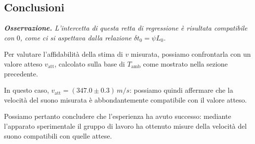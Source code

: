 \documentclass{article}
\begin{document}
\subsection{Conclusioni}
\emph{
  \textbf{Osservazione.}
  L'intercetta di questa retta di regressione è
  risultata compatibile con $0$, come ci si aspettava
  dalla relazione $\delta t_0 = \psi L_0$.
}

\vspace{2mm}
Per valutare l'affidabilità della stima di $v$ misurata,
possiamo confrontarla con un valore atteso $v_\text{att}$,
calcolato sulla base di $T_\text{amb}$ come mostrato nella
sezione precedente.

In questo caso, $v_\text{att} = (347.0\pm0.3)\,\unit{m \per s}$:
possiamo quindi affermare che la velocità del suono misurata
è abbondantemente compatibile con il valore atteso.

\vspace{5mm}
Possiamo pertanto concludere che l'esperienza ha avuto successo:
mediante l'apparato sperimentale il gruppo di lavoro ha ottenuto
misure della velocità del suono compatibili con quelle attese.
\end{document}
